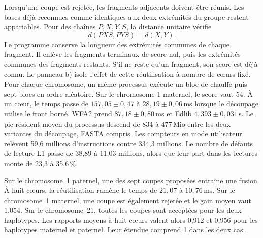 Lorsqu’une coupe est rejetée, les fragments adjacents doivent être réunis. Les bases déjà reconnues comme identiques aux deux extrémités du groupe restent appariables. Pour des chaînes \(P,X,Y,S\), la distance unitaire vérifie
\[
 d(PXS,PYS)=d(X,Y).
\]
Le programme conserve la longueur des extrémités communes de chaque fragment. Il enlève les fragments terminaux de score nul, puis les extrémités communes des fragments restants. S’il ne reste qu’un fragment, son score est déjà connu. Le panneau b) isole l’effet de cette réutilisation à nombre de cœurs fixé. Pour chaque chromosome, un même processus exécute un bloc de chauffe puis sept blocs en ordre aléatoire.
Sur le chromosome 1 maternel, le score vaut 54. À un cœur, le temps passe de \(157{,}05\pm0{,}47\) à \(28{,}19\pm0{,}06\)\,ms lorsque le découpage utilise le front borné. WFA2 prend \(87{,}18\pm0{,}80\)\,ms et Edlib \(4{,}393\pm0{,}031\)\,s. Le pic résident moyen du processus descend de 834 à 477\,Mio entre les deux variantes du découpage, FASTA compris. Les compteurs en mode utilisateur relèvent 59,6 millions d’instructions contre 334,3 millions. Le nombre de défauts de lecture L1 passe de 38,89 à 11,03 millions, alors que leur part dans les lectures monte de 23,3 à 35,6\,\%.

Sur le chromosome~1 paternel, une des sept coupes proposées entraîne une fusion. À huit cœurs, la réutilisation ramène le temps de \(21{,}07\) à \(10{,}76\)\,ms. Sur le chromosome~1 maternel, une coupe est également rejetée et le gain moyen vaut 1,054. Sur le chromosome~21, toutes les coupes sont acceptées pour les deux haplotypes. Les rapports moyens à huit cœurs valent alors 0,912 et 0,956 pour les haplotypes maternel et paternel. Leur étendue comprend 1 dans les deux cas.

